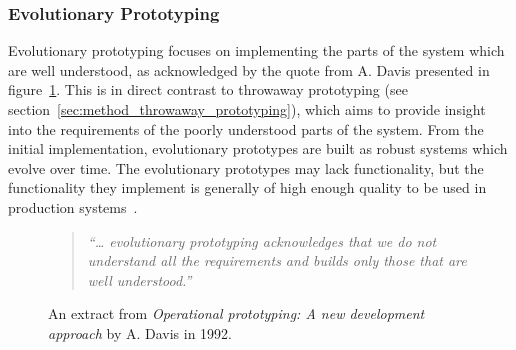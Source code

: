 
\subsubsection{Evolutionary Prototyping}
\label{sec:method_evolutionary_prototyping}

Evolutionary prototyping focuses on implementing the parts of the system which are well understood, as acknowledged by the quote from A. Davis presented in figure~\ref{fig:evolutionary_prototyping}. This is in direct contrast to throwaway prototyping (see section~\ref{sec:method_throwaway_prototyping}), which aims to provide insight into the requirements of the poorly understood parts of the system. From the initial implementation, evolutionary prototypes are built as robust systems which evolve over time. The evolutionary prototypes may lack functionality, but the functionality they implement is generally of high enough quality to be used in production systems~\cite{operational_prototyping}.

\begin{figure}[htbp]
	\begin{quote}
		\textit{``… evolutionary prototyping acknowledges that we do not understand all the requirements and builds only those that are well understood.''}~\cite{operational_prototyping}
	\end{quote}
	\caption{An extract from \textit{Operational prototyping: A new development approach} by A. Davis in 1992.}
	\label{fig:evolutionary_prototyping}
\end{figure}
